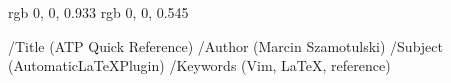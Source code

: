 \def\version{1.1}
%

\definecolor{blue2} 		{rgb} 	{0, 0, 0.933}
\definecolor{blue4} 		{rgb} 	{0, 0, 0.545}

\pdfpageheight=21cm  %
\pdfpagewidth=29.7cm
\pdfinfo %
{/Title (ATP Quick Reference)
 /Author (Marcin Szamotulski)
 /Subject (AutomaticLaTeXPlugin)
 /Keywords (Vim, LaTeX, reference)}
\def\bluelink#1#2{%
\leavevmode%
\textcolor{blue2}{\tenbf\begingroup\pdfstartlink%
attr{/BS<</Type/Border/S/S/W 1>>/C [1 1 1]}%
user{/Subtype/Link/A<</Type/Action/S/URI/URI(#1)>>}%
\ignorespaces#2%
\pdfendlink\endgroup}%
}

